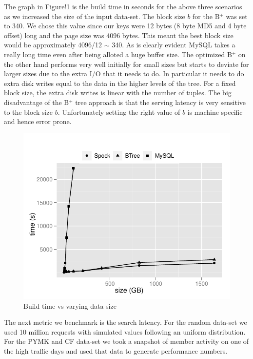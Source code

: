 The graph in Figure!\ref{build} is the build time in seconds for the
above three scenarios as we increased the size of the input data-set.
The block size $b$ for the B$^{+}$ was set to 340. We chose this value
since our keys were 12 bytes (8 byte MD5 and 4 byte offset) long and
the page size was 4096 bytes. This meant the best block size would be
approximately 4096/12 $\sim$ 340. As is clearly evident MySQL takes a
really long time even after being alloted a huge buffer size. The
optimized B$^{+}$ on the other hand performs very well initially for
small sizes but starts to deviate for larger sizes due to the extra
I/O that it needs to do. In particular it needs to do extra disk
writes equal to the data in the higher levels of the tree. For a fixed
block size, the extra disk writes is linear with the number of tuples.
The big disadvantage of the B$^{+}$ tree approach is that the serving
latency is very sensitive to the block size $b$. Unfortunately setting
the right value of $b$ is machine specific and hence error prone. 

\begin{figure}
  \centering
    \includegraphics[scale=0.55]{images/build.pdf}
  \caption{Build time vs varying data size}
  \label{build}
\end{figure}

The next metric we benchmark is the search latency. For the random
data-set we used 10 million requests with simulated values following
an uniform distribution. For the PYMK and CF data-set we took a
snapshot of member activity on one of the high traffic days and 
used that data to generate performance numbers.

